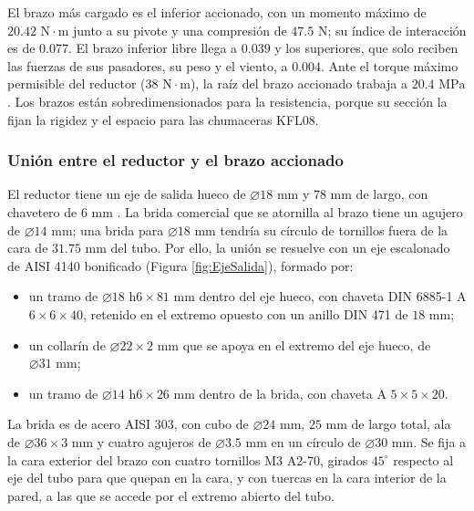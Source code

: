 \documentclass[../../General.tex]{subfiles}
\begin{document}
El brazo más cargado es el inferior accionado, con un momento máximo de $20.42\text{ N}\cdot\text{m}$ junto a su pivote y una compresión de $47.5\text{ N}$; su índice de interacción es de $0.077$. El brazo inferior libre llega a $0.039$ y los superiores, que solo reciben las fuerzas de sus pasadores, su peso y el viento, a $0.004$. Ante el torque máximo permisible del reductor ($38\text{ N}\cdot\text{m}$), la raíz del brazo accionado trabaja a $20.4\text{ MPa}$. Los brazos están sobredimensionados para la resistencia, porque su sección la fijan la rigidez y el espacio para las chumaceras KFL08.

\subsubsection{Unión entre el reductor y el brazo accionado}\label{subsubsec:eje_salida_elev}

El reductor tiene un eje de salida hueco de $\varnothing 18\text{ mm}$ y $78\text{ mm}$ de largo, con chavetero de $6\text{ mm}$ \citep{stepperonline_nmrvs40}. La brida comercial que se atornilla al brazo tiene un agujero de $\varnothing 14\text{ mm}$; una brida para $\varnothing 18\text{ mm}$ tendría su círculo de tornillos fuera de la cara de $31.75\text{ mm}$ del tubo. Por ello, la unión se resuelve con un eje escalonado de AISI 4140 bonificado (Figura \ref{fig:EjeSalida}), formado por:
\begin{itemize}
    \item un tramo de $\varnothing 18\text{ h6} \times 81\text{ mm}$ dentro del eje hueco, con chaveta DIN 6885-1 A $6 \times 6 \times 40$, retenido en el extremo opuesto con un anillo DIN 471 de $18\text{ mm}$;
    \item un collarín de $\varnothing 22 \times 2\text{ mm}$ que se apoya en el extremo del eje hueco, de $\varnothing 31\text{ mm}$;
    \item un tramo de $\varnothing 14\text{ h6} \times 26\text{ mm}$ dentro de la brida, con chaveta A $5 \times 5 \times 20$.
\end{itemize}

La brida es de acero AISI 303, con cubo de $\varnothing 24\text{ mm}$, $25\text{ mm}$ de largo total, ala de $\varnothing 36 \times 3\text{ mm}$ y cuatro agujeros de $\varnothing 3.5\text{ mm}$ en un círculo de $\varnothing 30\text{ mm}$. Se fija a la cara exterior del brazo con cuatro tornillos M3 A2-70, girados $45^\circ$ respecto al eje del tubo para que quepan en la cara, y con tuercas en la cara interior de la pared, a las que se accede por el extremo abierto del tubo.
\end{document}
